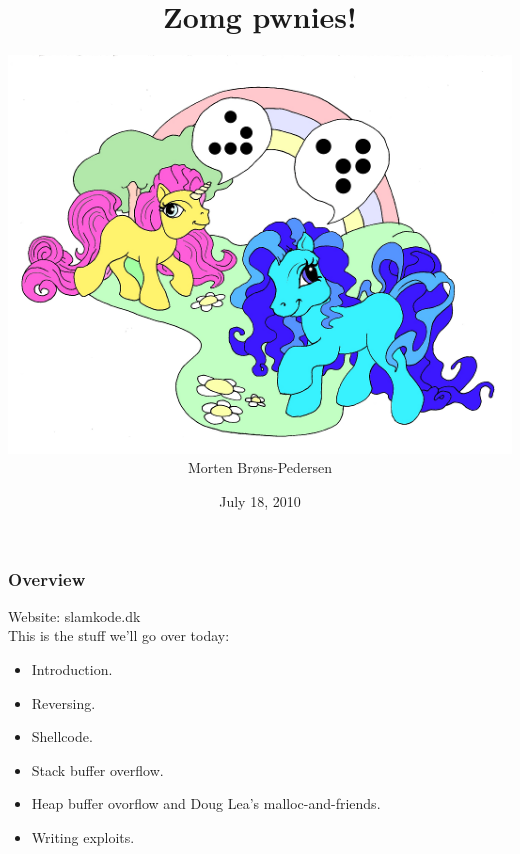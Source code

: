 \documentclass[slidestop,compress,mathserif, xcolor=table]{beamer}
\title[]{Zomg pwnies!}
\author[Morten Brøns-Pedersen]
       {\includegraphics[scale=0.3]{zomg-pwnies}\\Morten Brøns-Pedersen}
\institute[DIKU]{Department of Computer Science}
\date[]{July 18, 2010}
\begin{document}
\frame[plain]{\titlepage}

\begin{frame}
  \frametitle{Overview}

  Website: slamkode.dk\\[1em]

  This is the stuff we'll go over today:
  \begin{itemize}
  \item Introduction.
  \item Reversing.
  \item Shellcode.
  \item Stack buffer overflow.
  \item Heap buffer ovorflow and Doug Lea's malloc-and-friends.
  \item Writing exploits.
  \end{itemize}
\end{frame}
\end{document}
